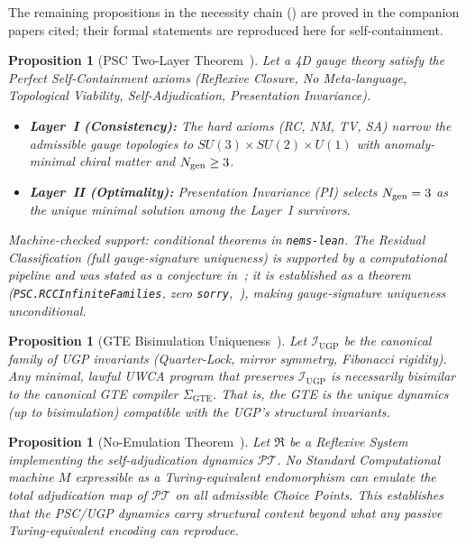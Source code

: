 \documentclass[11pt]{article}
\newtheorem{proposition}[theorem]{Proposition}
\theoremstyle{remark}
\newcommand{\UGP}{\text{UGP}}
\newcommand{\GTE}{\text{GTE}}
\begin{document}
\begin{appendices}
\medskip
The remaining propositions in the necessity chain () are proved in the companion papers cited; their formal statements are reproduced here for self-containment.

\begin{proposition}[PSC Two-Layer Theorem~{\cite{SpivackNEMS05}}]
\label{prop:psc_sketch}
Let a 4D gauge theory satisfy the Perfect Self-Containment axioms (Reflexive Closure, No Meta-language, Topological Viability, Self-Adjudication, Presentation Invariance).
\begin{itemize}[leftmargin=1em,itemsep=0.1em]
\item \textbf{Layer~I (Consistency):} The hard axioms (RC, NM, TV, SA) narrow the admissible gauge topologies to $SU(3) \times SU(2) \times U(1)$ with anomaly-minimal chiral matter and $N_{\rm gen} \ge 3$.
\item \textbf{Layer~II (Optimality):} Presentation Invariance (PI) selects $N_{\rm gen} = 3$ as the unique minimal solution among the Layer~I survivors.
\end{itemize}
Machine-checked support: conditional theorems in \texttt{nems-lean}.
The Residual Classification (full gauge-signature uniqueness) is supported by a computational pipeline and was stated as a conjecture in~\cite{SpivackNEMS05}; it is established as a theorem (\texttt{PSC.RCCInfiniteFamilies}, zero \texttt{sorry},~\cite{ugp-lean}), making gauge-signature uniqueness unconditional.
\end{proposition}

\begin{proposition}[GTE Bisimulation Uniqueness~{\cite{SpivackUGPFormalization}}]
\label{prop:gte_bisim}
Let $\mathcal{I}_{\UGP}$ be the canonical family of UGP invariants (Quarter-Lock, mirror symmetry, Fibonacci rigidity).
Any minimal, lawful UWCA program that preserves $\mathcal{I}_{\UGP}$ is necessarily bisimilar to the canonical GTE compiler $\Sigma_{\GTE}$.
That is, the GTE is the unique dynamics (up to bisimulation) compatible with the UGP's structural invariants.
\end{proposition}

\begin{proposition}[No-Emulation Theorem~{\cite{SpivackNEMS88}}]
\label{prop:no_emulation}
Let $\mathfrak{R}$ be a Reflexive System implementing the self-adjudication dynamics $\mathcal{PT}$.
No Standard Computational machine $M$ expressible as a Turing-equivalent endomorphism can emulate the total adjudication map of $\mathcal{PT}$ on all admissible Choice Points.
This establishes that the PSC/UGP dynamics carry structural content beyond what any passive Turing-equivalent encoding can reproduce.
\end{proposition}


\end{appendices}
\end{document}
